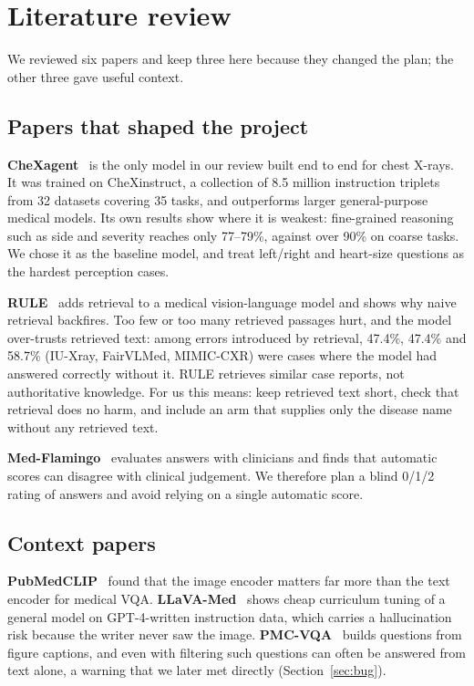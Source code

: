 \documentclass[11pt,a4paper]{article}
\begin{document}
\section{Literature review}
We reviewed six papers and keep three here because they changed the plan; the other three gave useful context.

\subsection{Papers that shaped the project}
\textbf{CheXagent}~\cite{chexagent} is the only model in our review built end to end for chest X-rays. It was trained on
CheXinstruct, a collection of 8.5 million instruction triplets from 32 datasets covering 35 tasks, and outperforms larger
general-purpose medical models. Its own results show where it is weakest: fine-grained reasoning such as side and severity
reaches only 77--79\%, against over 90\% on coarse tasks. We chose it as the baseline model, and treat left/right and
heart-size questions as the hardest perception cases.

\textbf{RULE}~\cite{rule} adds retrieval to a medical vision-language model and shows why naive retrieval backfires.
Too few or too many retrieved passages hurt, and the model over-trusts retrieved text: among errors introduced by retrieval,
47.4\%, 47.4\% and 58.7\% (IU-Xray, FairVLMed, MIMIC-CXR) were cases where the model had answered correctly without it.
RULE retrieves similar case reports, not authoritative knowledge. For us this means: keep retrieved text short, check
that retrieval does no harm, and include an arm that supplies only the disease name without any retrieved text.

\textbf{Med-Flamingo}~\cite{medflamingo} evaluates answers with clinicians and finds that automatic scores can disagree with
clinical judgement. We therefore plan a blind 0/1/2 rating of answers and avoid relying on a single automatic score.

\subsection{Context papers}
\textbf{PubMedCLIP}~\cite{pubmedclip} found that the image encoder matters far more than the text encoder for medical VQA.
\textbf{LLaVA-Med}~\cite{llavamed} shows cheap curriculum tuning of a general model on GPT-4-written instruction data, which
carries a hallucination risk because the writer never saw the image.
\textbf{PMC-VQA}~\cite{pmcvqa} builds questions from figure captions, and even with filtering such questions can often be
answered from text alone, a warning that we later met directly (Section~\ref{sec:bug}).
\end{document}
